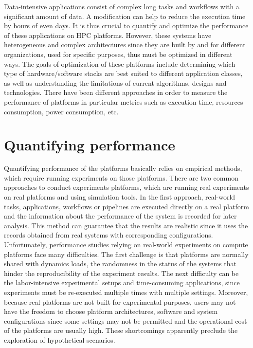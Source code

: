 Data-intensive applications consist of complex long tasks and workflows 
with a significant amount of data. 
A modification can help to reduce the execution time by hours of even days. 
It is thus crucial to quantify and optimize the performance of these applications 
on HPC platforms. 
However, these systems have heterogeneous and complex architectures since they 
are built by and for different organizations, used for specific purposes, thus must be 
optimized in different ways. 
The goals of optimization of these platforms include determining which type of 
hardware/software stacks are best suited to different application classes, 
as well as understanding the limitations of current algorithms, 
designs and technologies. 
There have been different approaches in order to measure the performance 
of platforms in particular metrics such as execution time, 
resources consumption, power consumption, etc. 

\section{Quantifying performance}

Quantifying performance of the platforms basically relies on empirical methods, 
which require running experiments on those platforms. 
There are two common approaches to conduct experiments platforms, which are 
running real experiments on real platforms and using simulation tools. 
In the first approach, real-world tasks, applications, workflows or pipelines are executed 
directly on a real platform and the information about the performance of the system 
is recorded for later analysis. 
This method can guarantee that the results are realistic since it uses the records 
obtained from real systems with corresponding configurations.
Unfortunately, performance studies relying on real-world experiments on 
compute platforms face many difficulties.
The first challenge is that platforms are normally shared with dynamics loads,
the randomness in the status of the systems that hinder the reproducibility 
of the experiment results.
The next difficulty can be the labor-intensive experimental setups and 
time-consuming applications, since experiments must be re-executed 
multiple times with multiple settings. 
Moreover, because real-platforms are not built for experimental purposes,
users may not have the freedom to choose platform architectures, software and 
system configurations since some settings may not be permitted and the 
operational cost of the platforms are usually high. 
These shortcomings apparently preclude the exploration of hypothetical scenarios.

